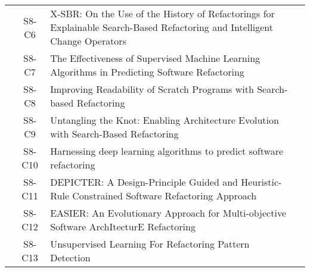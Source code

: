 \begin{longtable}{ccp{9cm}p{3cm}}
    & S8-C6   & X-SBR: On the Use of the History of Refactorings for Explainable Search-Based Refactoring and Intelligent Change Operators                                                                                                                     & \citeauthor*{Abid2021b}       \\
    & S8-C7   & The Effectiveness of Supervised Machine Learning Algorithms in Predicting Software Refactoring                                                                                                                                                 & \citeauthor*{Aniche2022}      \\
    & S8-C8   & Improving Readability of Scratch Programs with Search-based Refactoring                                                                                                                                                                        & \citeauthor*{Adler2021}       \\
    & S8-C9   & Untangling the Knot: Enabling Architecture Evolution with Search-Based Refactoring                                                                                                                                                             & \citeauthor*{Ivers2022}       \\
    & S8-C10  & Harnessing deep learning algorithms to predict software refactoring                                                                                                                                                                            & \citeauthor*{Alenezi2020}     \\
    & S8-C11  & DEPICTER: A Design-Principle Guided and Heuristic-Rule Constrained Software Refactoring Approach                                                                                                                                               & \citeauthor*{Zhao2022}        \\
    & S8-C12  & EASIER: An Evolutionary Approach for Multi-objective Software ArchItecturE Refactoring                                                                                                                                                         & \citeauthor*{Arcelli2018}     \\
    & S8-C13  & Unsupervised Learning For Refactoring Pattern Detection                                                                                                                                                                                        & \citeauthor*{Farah2021}       \\

\end{longtable}
